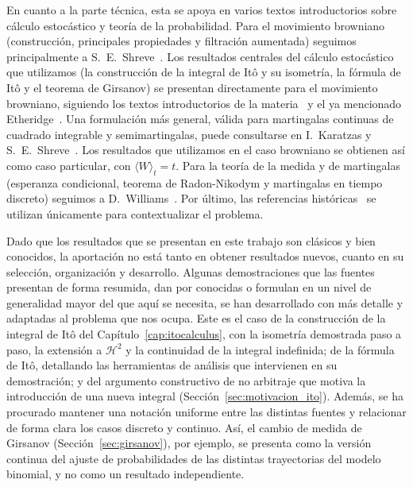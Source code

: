 \documentclass[11pt,a4paper,oneside]{report}
\theoremstyle{plain}
\theoremstyle{definition}
\theoremstyle{remark}
\newcommand{\1}{\mathbf{1}}
\begin{document}
En cuanto a la parte técnica, esta se apoya en varios textos introductorios sobre cálculo estocástico y teoría de la probabilidad. Para el movimiento browniano (construcción, principales propiedades y filtración aumentada) seguimos principalmente a S.~E.~Shreve~\cite{shreve}. Los resultados centrales del cálculo estocástico que utilizamos (la construcción de la integral de Itô y su isometría, la fórmula de Itô y el teorema de Girsanov) se presentan directamente para el movimiento browniano, siguiendo los textos introductorios de la materia~\cite{oksendal,shreve}
y el ya mencionado Etheridge~\cite{etheridge}. Una formulación más general, válida para martingalas continuas de cuadrado integrable y semimartingalas, puede consultarse en I.~Karatzas y
S.~E.~Shreve~\cite{karatzas-shreve}. Los resultados que utilizamos en el caso browniano se obtienen así como caso particular, con $\langle W\rangle_t = t$. Para la teoría de la medida y de martingalas (esperanza condicional, teorema de Radon-Nikodym y martingalas en tiempo discreto) seguimos a D.~Williams~\cite{williams}. Por último, las referencias históricas~\cite{bachelier,black-scholes,merton} se utilizan únicamente para contextualizar el problema.

Dado que los resultados que se presentan en este trabajo son clásicos y bien conocidos, la aportación no está tanto en obtener resultados nuevos, cuanto en su selección, organización y desarrollo. Algunas demostraciones que las fuentes presentan de forma resumida, dan por conocidas o formulan en un nivel de generalidad mayor del que aquí se necesita, se han desarrollado con más detalle y adaptadas al problema que nos ocupa. Este es el caso de la construcción de la integral de Itô del Capítulo~\ref{cap:itocalculus}, con la isometría demostrada paso a paso, la extensión a $\mathcal{H}^2$ y la continuidad de la integral indefinida; de la fórmula de Itô, detallando las herramientas de análisis que intervienen en su demostración; y del argumento constructivo de no arbitraje que motiva la introducción de una nueva integral (Sección~\ref{sec:motivacion_ito}). Además, se ha procurado mantener una notación uniforme entre las distintas fuentes y relacionar de forma clara los casos discreto y continuo. Así, el cambio de medida de Girsanov (Sección~\ref{sec:girsanov}), por ejemplo, se presenta como la versión continua del ajuste de probabilidades de las distintas trayectorias del modelo binomial, y no como un resultado independiente.
\end{document}
